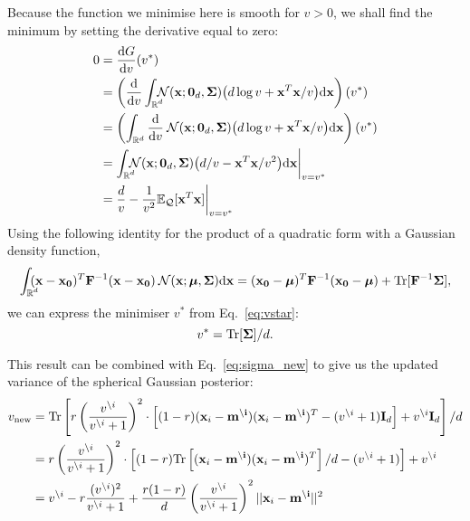 \documentclass[11pt]{article}
\begin{document}
Because the function we minimise here is smooth for $v > 0$, we shall 
find the minimum by setting the derivative equal to zero:
\begin{align}
	0 &= \frac{\byd G}{\byd v}(v^*) \\
	&= \left(\frac{\byd}{\byd v}\intrcc
		\norm(\vek{x}; \vek{0}_d, \vek{\Sigma})
		\big(d\log v + \vek{x}^T\vek{x}/v\big)\byd \vek{x}\right)(v^*) \\
	&= \left(\intr
		\frac{\byd}{\byd v}\norm(\vek{x}; \vek{0}_d, \vek{\Sigma})
		\big(d\log v + \vek{x}^T\vek{x}/v\big)\byd \vek{x}\right)(v^*) \\
	&= \intrcc
		\norm(\vek{x}; \vek{0}_d, \vek{\Sigma})
		\big(d/v - \vek{x}^T\vek{x}/v^2\big)\byd \vek{x}\bigg|_{v=v^*} \\
	&= \frac{d}{v} - \frac{1}{v^2} \ee_{\kve}[\vek{x}^T\vek{x}] 
\bigg|_{v=v^*}
	\label{eq:vstar}
\end{align}
Using the following identity for the product of a quadratic form with 
a Gaussian density function,
\begin{equation}
	\intrc
		(\vek{x}-\vek{x_0})^T\vek{F}^{-1}(\vek{x}-\vek{x_0})
		\norm(\vek{x}; \boldsymbol{\mu}, \vek{\Sigma}) \byd\vek{x}
	= (\vek{x_0} - \boldsymbol{\mu})^T\vek{F}^{-1}(\vek{x_0} - \boldsymbol{\mu})
	+ \text{Tr}[\vek{F}^{-1}\vek{\Sigma}],
\end{equation}
we can express the minimiser $v^*$ from Eq.~\eqref{eq:vstar}:
\begin{equation}
	v^* = \text{Tr}[\mathbf{\Sigma}] / d.
\end{equation}

This result can be combined with Eq.~\eqref{eq:sigma_new} to give us the 
updated variance of the spherical Gaussian posterior:
\begin{align}
		v_{\text{new}} &=
			\text{Tr}\left[r\left(\frac{v^{\setminus i}}{v^{\setminus i} 
			+ 1}\right)^2
			\cdot\left[
				(1 - r)(\mathbf{x}_i - \mathbf{m^{\setminus i}})(\mathbf{x}_i - \mathbf{m^{\setminus i}})^T
				- (v^{\setminus i} + 1)\mathbf{I}_d
			\right]
			+ v^{\setminus i}\mathbf{I}_d\right] / d \\
		&=
			r\left(\frac{v^{\setminus i}}{v^{\setminus i} + 1}\right)^2
			\cdot\left[(1 - r)
			\text{Tr}\left[(\mathbf{x}_i - \mathbf{m^{\setminus i}})
									   (\mathbf{x}_i - \mathbf{m^{\setminus i}})^T\right] / d
				- (v^{\setminus i} + 1)\right]
			+ v^{\setminus i} \\
		&=  v^{\setminus i}
			- r \frac{(v^{\setminus i})^2}{v^{\setminus i} + 1}
			+ \frac{r(1 - r)}{d}
				\left(\frac{v^{\setminus i}}{v^{\setminus i} + 1}\right)^2
				||\mathbf{x}_i - \mathbf{m^{\setminus i}}||^2
		\label{eq:vnew}
\end{align}
\end{document}
